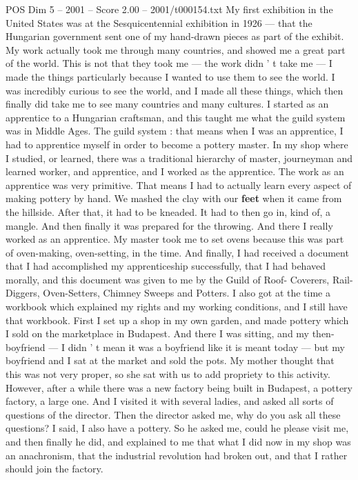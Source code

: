 \begin{textsample}{POS Dim 5 – 2001 – Score 2.00 – 2001/t000154.txt}
My first exhibition in the United States was at the Sesquicentennial exhibition in 1926 — that the Hungarian government sent one of my hand-drawn pieces as part of the exhibit.
My work actually took me through many countries, and showed me a great part of the world.
This is not that they took me — the work didn ' t take me — I made the things particularly because I wanted to use them to see the world.
I was incredibly curious to see the world, and I made all these things, which then finally did take me to see many countries and many cultures.
I started as an apprentice to a Hungarian craftsman, and this taught me what the guild system was in Middle Ages.
The guild system : that means when I was an apprentice, I had to apprentice myself in order to become a pottery master.
In my shop where I studied, or learned, there was a traditional hierarchy of master, journeyman and learned worker, and apprentice, and I worked as the apprentice.
The work as an apprentice was very primitive.
That means I had to actually learn every aspect of making pottery by hand.
We mashed the clay with our \textbf{feet} when it came from the hillside.
After that, it had to be kneaded.
It had to then go in, kind of, a mangle.
And then finally it was prepared for the throwing.
And there I really worked as an apprentice.
My master took me to set ovens because this was part of oven-making, oven-setting, in the time.
And finally, I had received a document that I had accomplished my apprenticeship successfully, that I had behaved morally, and this document was given to me by the Guild of Roof- Coverers, Rail-Diggers, Oven-Setters, Chimney Sweeps and Potters.
I also got at the time a workbook which explained my rights and my working conditions, and I still have that workbook.
First I set up a shop in my own garden, and made pottery which I sold on the marketplace in Budapest.
And there I was sitting, and my then-boyfriend — I didn ' t mean it was a boyfriend like it is meant today — but my boyfriend and I sat at the market and sold the pots.
My mother thought that this was not very proper, so she sat with us to add propriety to this activity.
However, after a while there was a new factory being built in Budapest, a pottery factory, a large one.
And I visited it with several ladies, and asked all sorts of questions of the director.
Then the director asked me, why do you ask all these questions?
I said, I also have a pottery.
So he asked me, could he please visit me, and then finally he did, and explained to me that what I did now in my shop was an anachronism, that the industrial revolution had broken out, and that I rather should join the factory.

\end{textsample}
